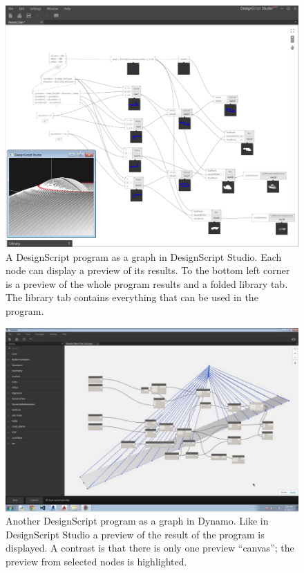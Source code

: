 \documentclass{./llncs2e/llncs}
\begin{document}
	\begin{figure}
	  \centering
	  \includegraphics[width=1.0\textwidth]{img/ds_dsstudio}
	    \caption{A DesignScript program as a graph in DesignScript Studio. Each node can display a preview of its results. To the bottom left corner is a preview of the whole program results and a folded library tab. The library tab contains everything that can be used in the program.}
	  \label{fig:ds:dsstudio}
	\end{figure} 

	\begin{figure}
	  \centering
	  \includegraphics[width=1.0\textwidth]{img/ds_dynamo}
	    \caption{Another DesignScript program as a graph in Dynamo. Like in DesignScript Studio a preview of the result of the program is displayed. A contrast is that there is only one preview ``canvas''; the preview from selected nodes is highlighted.}
	  \label{fig:ds:dynamo}
	\end{figure} 
\end{document}
